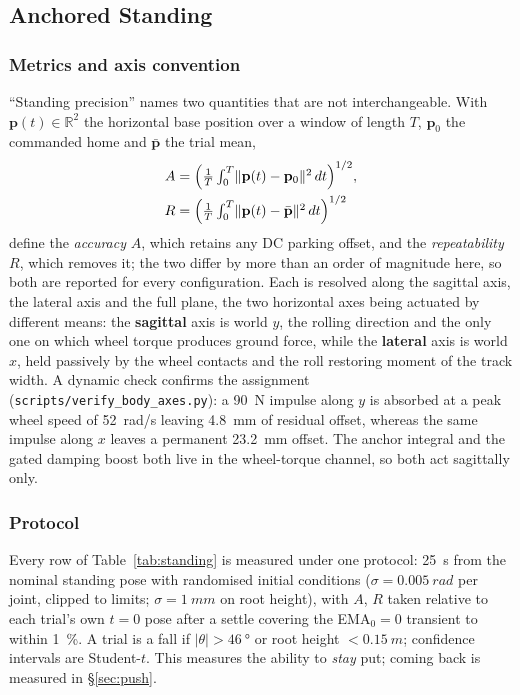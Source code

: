 \documentclass{jcd}
\begin{document}
\subsection{Anchored Standing}
\label{sec:standing}

\subsubsection{Metrics and axis convention}

``Standing precision'' names two quantities that are not interchangeable. With
$\mathbf{p}(t)\in\mathbb{R}^2$ the horizontal base position over a window of
length $T$, $\mathbf{p}_0$ the commanded home and $\bar{\mathbf{p}}$ the trial
mean,
\begin{align}
A &= \Bigl(\tfrac{1}{T}\textstyle\int_0^T \lVert\mathbf{p}(t)-\mathbf{p}_0\rVert^2\,dt\Bigr)^{1/2},
\label{eq:accuracy}\\
R &= \Bigl(\tfrac{1}{T}\textstyle\int_0^T \lVert\mathbf{p}(t)-\bar{\mathbf{p}}\rVert^2\,dt\Bigr)^{1/2}
\label{eq:repeatability}
\end{align}
define the \emph{accuracy} $A$, which retains any DC parking offset, and the
\emph{repeatability} $R$, which removes it; the two differ by more than an order
of magnitude here, so both are reported for every configuration. Each is
resolved along the sagittal axis, the lateral axis and the full plane, the two
horizontal axes being actuated by different means: the \textbf{sagittal} axis is
world $y$, the rolling direction and the only one on which wheel torque produces
ground force, while the \textbf{lateral} axis is world $x$, held passively by the
wheel contacts and the roll restoring moment of the track width. A dynamic check
confirms the assignment (\texttt{scripts/verify\_body\_axes.py}): a \SI{90}{N}
impulse along $y$ is absorbed at a peak wheel speed of \SI{52}{rad/s} leaving
\SI{4.8}{mm} of residual offset, whereas the same impulse along $x$ leaves a
permanent \SI{23.2}{mm} offset. The anchor integral and the gated damping boost
both live in the wheel-torque channel, so both act sagittally only.

\subsubsection{Protocol}

Every row of Table~\ref{tab:standing} is measured under one protocol:
\SI{25}{s} from the nominal standing pose with randomised initial conditions
($\sigma{=}\SI{0.005}{rad}$ per joint, clipped to limits; $\sigma{=}\SI{1}{mm}$
on root height), with $A$, $R$ taken relative to each trial's own $t{=}0$ pose
after a settle covering the EMA$_0{=}0$ transient to within \SI{1}{\percent}. A
trial is a fall if $|\theta|{>}\SI{46}{\degree}$ or root height
${<}\SI{0.15}{m}$; confidence intervals are Student-$t$. This measures the
ability to \emph{stay} put; coming back is measured in \S\ref{sec:push}.
\end{document}
